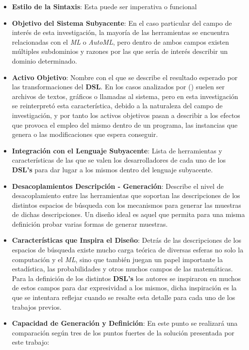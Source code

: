 \begin{itemize}
    \item {\bf Estilo de la Sintaxis}: Esta puede ser imperativa o funcional
    \item {\bf Objetivo del Sistema Subyacente}: En el caso particular del campo de interés de esta
          investigación, la mayoría de las herramientas se encuentra relacionadas con el {\it ML} o
              {\it AutoML}, pero dentro de ambos campos existen múltiples subdominios y razones por las que
          sería de interés describir un dominio determinado.
    \item {\bf Activo Objetivo}: Nombre con el que se describe el resultado esperado por las transformaciones
          del {\bf DSL}. En los casos analizados por (\cite{langlois2007dsl}) suelen ser archivos de textos, gráficos o llamadas
          al sistema, pero en esta investigación se reinterpretó esta característica, debido a la
          naturaleza del campo de investigación, y por tanto los activos objetivos pasan a describir a
          los efectos que provoca el empleo del mismo dentro de un programa, las instancias que
          genera o las modificaciones que espera conseguir.
    \item {\bf Integración con el Lenguaje Subyacente}: Lista de herramientas y características de las
          que se valen los desarrolladores de cada uno de los {\bf DSL's} para dar lugar a los mismos dentro
          del lenguaje subyacente.
    \item {\bf Desacoplamientos Descripción - Generación}: Describe el nivel de desacoplamiento entre
          las herramientas que soportan las descripciones de los distintos espacios de búsqueda con
          los mecanismos para generar las muestras de dichas descripciones. Un diseño ideal
          es aquel que permita para una misma definición probar varias formas de generar muestras.
    \item {\bf Características que Inspira el Diseño}: Detrás de las descripciones de los espacios de
          búsqueda existe mucho carga teórica de diversas esferas no solo la computación y el {\it ML},
          sino que también juegan un papel importante la estadística, las probabilidades y otros muchos
          campos de las matemáticas. Para la definición de los distintos {\bf DSL's} los autores se inspiraron
          en muchos de estos campos para dar expresividad a los mismos, dicha inspiración es la que se
          intentara reflejar cuando se resalte esta detalle para cada uno de los trabajos previos.
    \item {\bf Capacidad de Generación y Definición}: En este punto se realizará una comparación según tres
          de los puntos fuertes de la solución presentada por este trabajo:
          \begin{itemize}


\end{itemize}
\end{itemize}
